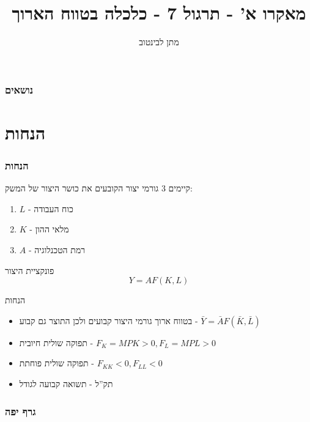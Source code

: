 \documentclass[usenames,dvipsnames]{beamer}
\title[]{{מאקרו א' - תרגול  7 - כלכלה בטווח הארוך}}
\author{\texthebrew{ מתן לבינטוב}}
\institute[{{ אב"ג}}]{{ אוניברסיטת בן גוריון בנגב}}
\date{}
\begin{document}
\begin{RTL}
\begin{frame}
\titlepage
\end{frame}
\begin{frame}
    \frametitle{נושאים}
    \tableofcontents
    

\end{frame}
\section{הנחות}
\begin{frame}[allowframebreaks]
    \frametitle{הנחות}
    קיימים 3 גורמי יצור הקובעים את כושר היצור של המשק: 
    \begin{enumerate}
        \item $L$ - כוח העבודה
        \item $K$ - מלאי ההון
        \item $A$ - רמת הטכנלוגיה
    \end{enumerate}

    \begin{block}{פונקציית היצור}
        $$Y = AF(K,L)$$
    \end{block}
    \begin{block}{הנחות}
        \begin{itemize}
            \item בטווח ארוך גורמי היצור קבועים ולכן התוצר גם קבוע - $\bar Y = \bar A F(\bar K, \bar L)$
            \item תפוקה שולית חיובית - $F_K = MPK > 0 , F_L = MPL > 0$
            \item תפוקה שולית פוחתת - $F_{KK} < 0 , F_{LL} < 0$
            \item תק''ל - תשואה קבועה לגודל
        \end{itemize}
    \end{block}
    \end{frame}

    \begin{frame}
        \frametitle{גרף יפה}
        \begin{center}
        \end{center}
    

\end{frame}
\end{RTL}
\end{document}
